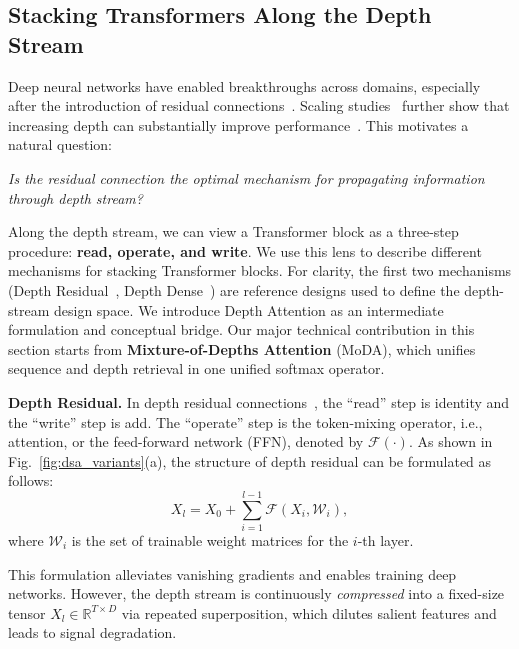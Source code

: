 \documentclass[]{bytedance_seed}
\newcommand{\myPara}[1]{\vspace{.05in}\noindent\textbf{#1.}}
\newcommand{\name}{MoDA}
\begin{document}
\subsection{Stacking Transformers Along the Depth Stream}

Deep neural networks have enabled breakthroughs across domains, especially after the introduction of residual connections~\cite{he2016resnet}. 
Scaling studies~\cite{kaplan2020scalinglaw,hoffmann2022chinchilla,hestness2017deepscaling} further show that increasing depth can substantially improve performance~\cite{simonyan2014vdcn,szegedy2015godeep}. 
This motivates a natural question:

\textit{Is the residual connection the optimal mechanism for propagating information through depth stream?}

Along the depth stream, we can view a Transformer block as a three-step procedure: \textbf{read, operate, and write}. 
We use this lens to describe different mechanisms for stacking Transformer blocks.
For clarity, the first two mechanisms (Depth Residual~\cite{he2016resnet}, Depth Dense~\cite{huang2017densenet, pagliardini2024denseformer}) are reference designs used to define the depth-stream design space.
We introduce Depth Attention as an intermediate formulation and conceptual bridge.
Our major technical contribution in this section starts from \textbf{Mixture-of-Depths Attention} (\name{}), which unifies sequence and depth retrieval in one unified softmax operator.

\myPara{Depth Residual} 
In depth residual connections~\cite{he2016resnet,srivastava2015highway}, the ``read'' step is identity and the ``write'' step is add.
The ``operate'' step is the token-mixing operator, i.e., attention, or the feed-forward network (FFN), denoted by $\mathcal{F}(\cdot)$.
As shown in Fig.~\ref{fig:dsa_variants}(a), the structure of depth residual can be formulated as follows:
\begin{equation}
  X_{l}=X_0+\sum^{l-1}_{i=1}\mathcal{F}(X_i, \mathcal{W}_{i}),
\end{equation}
where $\mathcal{W}_{i}$ is the set of trainable weight matrices for the $i$-th layer.

This formulation alleviates vanishing gradients and enables training deep networks. 
However, the depth stream is continuously \emph{compressed} into a fixed-size tensor $X_l\in \mathbb{R}^{T\times D}$ via repeated superposition, which dilutes salient features and leads to signal degradation.
\end{document}
